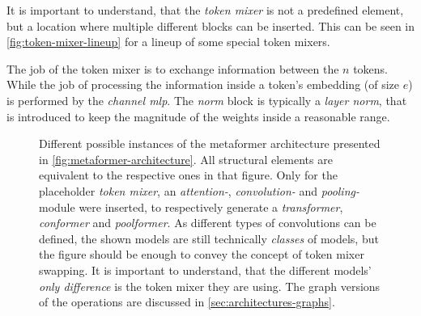 It is important to understand, that the \emph{token mixer} is not a predefined element, but a location where multiple different blocks can be inserted. 
This can be seen in \autoref{fig:token-mixer-lineup} for a lineup of some special token mixers. 

The job of the token mixer is to exchange information between the $n$ tokens. 
While the job of processing the information inside a token's embedding (of size $e$) is performed by the \emph{channel mlp}.
The \emph{norm} block is typically a \emph{layer norm}, that is introduced to keep the magnitude of the weights inside a reasonable range.

\begin{figure}[htbp]
    \centering
    \caption{Different possible instances of the metaformer architecture presented in \autoref{fig:metaformer-architecture}.
        All structural elements are equivalent to the respective ones in that figure. 
        Only for the placeholder \emph{token mixer}, an \emph{attention-}, \emph{convolution-} and \emph{pooling-}module were inserted, to respectively generate a \emph{transformer}, \emph{conformer} and \emph{poolformer}.
        As different types of convolutions can be defined, the shown models are still technically \emph{classes} of models, but the figure should be enough to convey the concept of token mixer swapping.
        It is important to understand, that the different models' \emph{only difference} is the token mixer they are using.
        The graph versions of the operations are discussed in \autoref{sec:architectures-graphs}.
    }
    \label{fig:token-mixer-lineup}
\end{figure}

